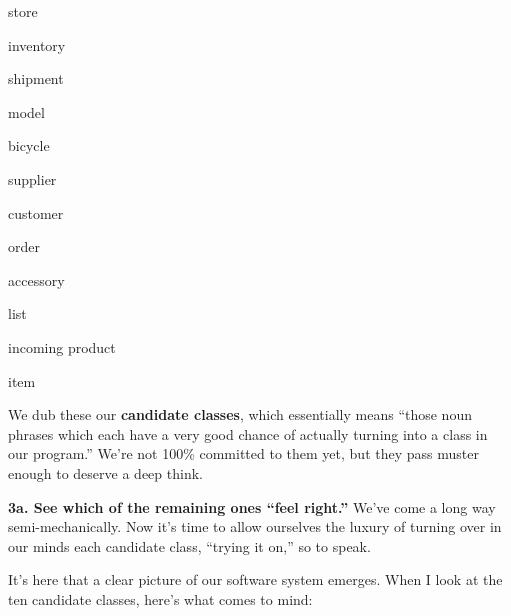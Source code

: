 \vspace{-.2in}
\begin{samepage}
\begin{center}
\parbox{.8\textwidth}{
\begin{multicols}{2}
\begin{compactitem}
\item \textsf{store}
\item \textsf{inventory}
\item \textsf{shipment}
\item \textsf{model}
\item \textsf{bicycle}
\item \textsf{supplier}
\columnbreak
\item \textsf{customer}
\item \textsf{order}
\item \textsf{accessory}
\item \textsf{list}
\item \textsf{incoming product}
\item \textsf{item}
\end{compactitem}
\end{multicols}
}
\end{center}
\end{samepage}
\vspace{-.1in}

\label{candidate class}
We dub these our \textbf{candidate classes}, which essentially means ``those
noun phrases which each have a very good chance of actually turning into a
class in our program.'' We're not 100\% committed to them yet, but they pass
muster enough to deserve a deep think.

\vspace{.3in}

\pagebreak
\textbf{3a. See which of the remaining ones ``feel right.''} We've come a long
way semi-mechanically. Now it's time to allow ourselves the luxury of turning
over in our minds each candidate class, ``trying it on,'' so to speak. 

It's here that a clear picture of our software system emerges. When I look at
the ten candidate classes, here's what comes to mind:

